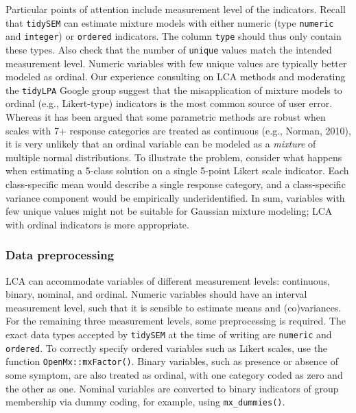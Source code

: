\documentclass[
  ,man,floatsintext]{apa6}
\begin{document}
Particular points of attention include measurement level of the
indicators. Recall that \texttt{tidySEM} can estimate mixture models with
either numeric (type \texttt{numeric} and \texttt{integer}) or \texttt{ordered} indicators.
The column \texttt{type} should thus only contain these types. Also check that
the number of \texttt{unique} values match the intended measurement level.
Numeric variables with few unique values are typically better modeled as
ordinal. Our experience consulting on LCA methods and moderating the
\texttt{tidyLPA} Google group suggest that the misapplication of mixture models
to ordinal (e.g., Likert-type) indicators is the most common source of
user error. Whereas it has been argued that some parametric methods are
robust when scales with 7+ response categories are treated as continuous
(e.g., Norman, 2010), it is very unlikely that an ordinal
variable can be modeled as a \emph{mixture} of multiple normal distributions.
To illustrate the problem, consider what happens when estimating a
5-class solution on a single 5-point Likert scale indicator. Each
class-specific mean would describe a single response category, and a
class-specific variance component would be empirically underidentified.
In sum, variables with few unique values might not be suitable for
Gaussian mixture modeling; LCA with ordinal indicators is more
appropriate.

\hypertarget{data-preprocessing}{%
\subsubsection{Data preprocessing}\label{data-preprocessing}}

LCA can accommodate variables of different measurement levels:
continuous, binary, nominal, and ordinal. Numeric variables should have
an interval measurement level, such that it is sensible to estimate
means and (co)variances. For the remaining three measurement levels,
some preprocessing is required. The exact data types accepted by
\texttt{tidySEM} at the time of writing are \texttt{numeric} and \texttt{ordered}. To
correctly specify ordered variables such as Likert scales, use the
function \texttt{OpenMx::mxFactor()}. Binary variables, such as presence or
absence of some symptom, are also treated as ordinal, with one category
coded as zero and the other as one. Nominal variables are converted to
binary indicators of group membership via dummy coding, for example,
using \texttt{mx\_dummies()}.
\end{document}
